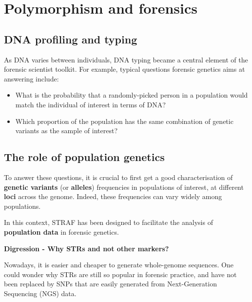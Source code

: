 \documentclass[
]{book}
\begin{document}
\hypertarget{polymorphism-and-forensics}{%
\section*{Polymorphism and forensics}\label{polymorphism-and-forensics}}

\hypertarget{dna-profiling-and-typing}{%
\subsection*{DNA profiling and typing}\label{dna-profiling-and-typing}}

As DNA varies between individuals, DNA typing became a central element of the forensic
scientist toolkit. For example, typical questions forensic genetics aims at
answering include:

\begin{itemize}
\item
  What is the probability that a randomly-picked person in a population would
  match the individual of interest in terms of DNA?
\item
  Which proportion of the population has the same combination of
  genetic variants as the sample of interest?
\end{itemize}

\hypertarget{the-role-of-population-genetics}{%
\subsection*{The role of population genetics}\label{the-role-of-population-genetics}}

To answer these questions, it is crucial to first get a good characterisation
of \textbf{genetic variants} (or \textbf{alleles}) frequencies in populations of interest,
at different \textbf{loci} across the genome. Indeed, these frequencies can vary
widely among populations.

In this context, STRAF has been designed to facilitate the analysis of
\textbf{population data} in forensic genetics.

\textbf{Digression - Why STRs and not other markers?}

Nowadays, it is easier and cheaper to generate whole-genome sequences. One could
wonder why STRs are still so popular in forensic practice, and have not been replaced
by SNPs that are easily generated from Next-Generation Sequencing (NGS) data.
\end{document}
